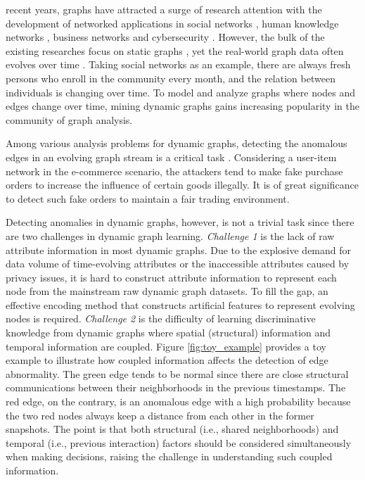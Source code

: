 \documentclass[10pt,journal,compsoc]{IEEEtran}
\newcommand{\HL}{}
\newcommand{\yg}{}
\begin{document}

 \HL{recent years}, graphs have attracted a surge of research attention \HL{with the development of networked applications} in social networks \cite{wang2019influence}, human knowledge networks \cite{ji2020survey}, business networks \cite{zheng2020clustering} and cybersecurity \cite{gao2020hincti}.
However, the bulk of the existing researches \HL{focus} on static graphs \cite{jin2021survey,xia2021graph}, yet the real-world graph data often evolves over time \cite{peng2021lime,jiao2021temporal}. Taking social networks as an example, there are always fresh persons who enroll in the community every month, and the relation between individuals is changing over time. To model and analyze graphs where nodes and edges change over time, mining dynamic graphs gains increasing popularity in the community of graph analysis.

Among various analysis problems for dynamic graphs, detecting the anomalous edges in an evolving graph stream is a critical task \cite{yu2018netwalk,zheng2019addgraph}. Considering a user-item network in the e-commerce \yg{scenario}, the attackers tend to make fake purchase orders to increase the influence of certain goods illegally. It is of great significance to detect such fake orders \HL{to maintain} a fair trading environment.

Detecting anomalies in dynamic graphs, however, is not a trivial task since there are two challenges in dynamic graph learning. 
\textit{Challenge 1} is the lack of raw attribute information in most dynamic graphs. Due to the explosive demand for data volume of time-evolving attributes or the inaccessible attributes caused by privacy issues, it is hard to construct attribute information to represent each node from the mainstream raw dynamic graph datasets. 
\HL{To fill the gap}, an effective encoding method \HL{that constructs artificial features to represent evolving nodes} is required. 
\textit{Challenge 2} is the difficulty of learning discriminative knowledge from dynamic graphs where spatial (structural) information and temporal information are coupled. Figure \ref{fig:toy_example} provides a toy example to illustrate how coupled information affects the detection of edge abnormality. The green edge tends to be normal since there are close structural communications between their neighborhoods in the previous timestamps. The red edge, on the contrary, is an anomalous edge with a high probability because the two red nodes always keep a distance from each other in the former snapshots. The point is that both structural \HL{(i.e., shared neighborhoods)} and temporal \HL{(i.e., previous interaction)} factors should be considered simultaneously when making decisions, \HL{raising the} challenge in understanding such coupled information.
\end{document}
